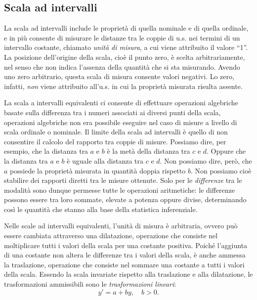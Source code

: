 \subsection{Scala ad intervalli}

La scala ad intervalli include le proprietà di quella nominale e di quella ordinale, e in più consente di misurare le distanze tra le coppie di u.s. nei termini di un intervallo costante, chiamato \emph{unità di misura}, a cui viene attribuito il valore ``1''.  La posizione dell'origine della scala, cioè il punto zero, è scelta arbitrariamente, nel senso che non indica l'assenza della quantità che si sta misurando. Avendo uno zero arbitrario, questa scala di misura consente valori negativi. Lo zero, infatti, \emph{non} viene attribuito all'u.s. in cui la proprietà misurata risulta assente.
 
La scala a intervalli equivalenti ci consente di effettuare operazioni algebriche basate sulla differenza tra i numeri associati ai diversi punti della scala, operazioni algebriche non era possibile eseguire nel caso di misure a livello di scala ordinale o nominale. Il limite della scala ad intervalli è  quello di non consentire il calcolo del rapporto tra coppie di misure. Possiamo dire, per esempio, che la distanza tra  $a$ e $b$ è la metà della distanza tra $c$ e $d$. Oppure che la distanza tra $a$ e $b$ è uguale alla distanza tra $c$ e $d$. Non possiamo dire, però, che  $a$ possiede la proprietà misurata in quantità doppia rispetto  $b$. Non possiamo cioè stabilire dei rapporti diretti tra le misure ottenute. Solo per le \emph{differenze} tra le modalità sono dunque permesse tutte le operazioni aritmetiche: le differenze  possono essere tra loro sommate, elevate a potenza oppure divise, determinando così le quantità che stanno alla base della statistica inferenziale. 
 
Nelle scale ad intervalli equivalenti, l'unità di misura è arbitraria, ovvero può essere cambiata attraverso una dilatazione, operazione che consiste nel moltiplicare tutti i valori della scala per una costante positiva.
Poiché l'aggiunta di una costante non altera le differenze tra i valori della scala, è anche ammessa la traslazione, operazione che consiste nel sommare una costante a tutti i valori della scala. 
Essendo la scala invariate rispetto alla traslazione e alla dilatazione, le trasformazioni ammissibili sono le \emph{trasformazioni lineari}:
\[
y' = a + by, \quad b > 0.
\]

